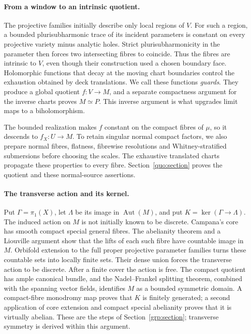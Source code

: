 \documentclass[11pt]{article}
\theoremstyle{definition}
\theoremstyle{remark}
\DeclareMathOperator{\Aut}{Aut}
\begin{document}
\paragraph{From a window to an intrinsic quotient.}
The projective families initially describe only local regions of
\(V\). For such a region, a bounded plurisubharmonic trace of its
incident parameters is constant on every projective variety minus
analytic holes. Strict plurisubharmonicity in the parameter then
forces two intersecting fibres to coincide. Thus the fibres are
intrinsic to \(V\), even though their construction used a chosen
boundary face. Holomorphic functions that decay at the moving chart
boundaries control the exhaustion obtained by deck translations.
We call these functions \emph{guards}.
They produce a global quotient \(f:V\to M\), and a separate
compactness argument for the inverse charts proves \(M\simeq P\).
This inverse argument is what upgrades limit maps to a
biholomorphism.

The bounded realization makes \(f\) constant on the compact fibres
of \(\mu\), so it descends to \(f_X:U\to M\). To retain singular
normal compact factors, we also prepare normal fibres, flatness,
fibrewise resolutions and Whitney-stratified submersions before
choosing the scales. The exhaustive translated charts propagate
these properties to every fibre. Section~\ref{quo:section} proves
the quotient and these normal-source assertions.

\paragraph{The transverse action and its kernel.}
Put \(\Gamma=\pi_1(X)\), let \(\Lambda\) be its image in
\(\Aut(M)\), and put \(K=\ker(\Gamma\to\Lambda)\).
The induced action on \(M\) is not initially known to be discrete.
Campana's core has smooth compact special general fibres. The
abelianity theorem and a Liouville argument show that the lifts of
each such fibre have countable image in \(M\). Orbifold extension
to the full proper projective parameter families turns these
countable sets into locally finite sets. Their dense union forces
the transverse action to be discrete. After a finite cover the
action is free. The compact quotient has ample canonical bundle,
and the Nadel--Frankel splitting theorem, combined with the spanning
vector fields, identifies \(M\) as a bounded symmetric domain.
A compact-fibre monodromy map proves that \(K\) is finitely generated;
a second application of core extension and compact special
abelianity proves that it is virtually abelian.
These are the steps of Section~\ref{grp:section}; transverse
symmetry is derived within this argument.
\end{document}
